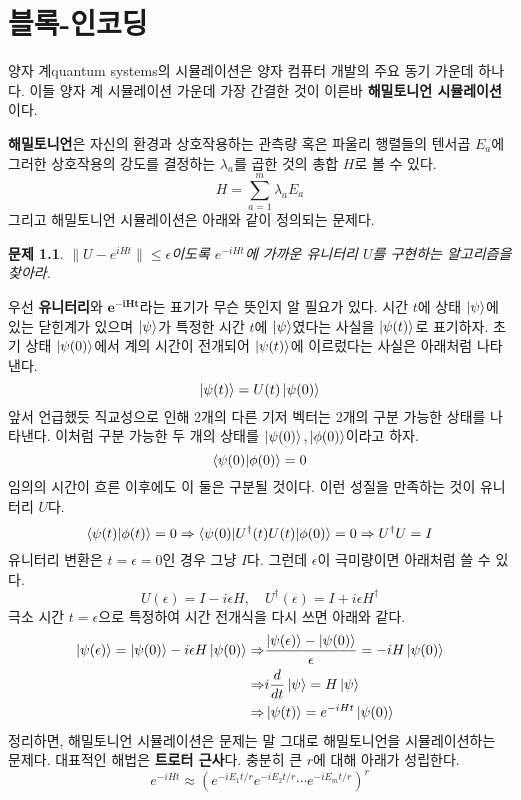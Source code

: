 \documentclass[a4paper,atbegshi,chapter,]{oblivoir}
\newtheorem{prob}{문제}[chapter]
\begin{document}
\chapter{블록-인코딩}
양자 계{\tiny quantum systems}의 시뮬레이션은 양자 컴퓨터 개발의 주요 동기 가운데 하나다.
이들 양자 계 시뮬레이션 가운데 가장 간결한 것이 이른바 \textbf{해밀토니언 시뮬레이션}이다.

\textbf{해밀토니언}은 자신의 환경과 상호작용하는 관측량 혹은 파울리 행렬들의 텐서곱
$E_a$에 그러한 상호작용의 강도를 결정하는 $\lambda_a$를 곱한 것의 총합 $H$로 볼 수 있다.
\[
  H = \sum_{a=1}^m\lambda_a E_a
\]
그리고 해밀토니언 시뮬레이션은 아래와 같이 정의되는 문제다.
\begin{prob}
  $\|U-e^{iHt}\|\leq\epsilon$이도록 $e^{-iHt}$에 가까운 유니터리 $U$를 구현하는
  알고리즘을 찾아라.
\end{prob}
우선 \textbf{유니터리}와 $\pmb{e^{-iHt}}$라는 표기가 무슨 뜻인지 알 필요가 있다.
시간 $t$에 상태 $\ket{\psi}$에 있는 닫힌계가 있으며 $\ket{\psi}$가 특정한 시간 $t$에
$\ket{\psi}$였다는 사실을 $\ket{\psi(t)}$로 표기하자. 초기 상태 $\ket{\psi(0)}$에서
계의 시간이 전개되어 $\ket{\psi(t)}$에 이르렀다는 사실은 아래처럼 나타낸다.
\[
  \ket{\psi(t)}=U(t)\ket{\psi(0)}
\]
앞서 언급했듯 직교성으로 인해 2개의 다른 기저 벡터는 2개의 구분 가능한 상태를 나타낸다.
이처럼 구분 가능한 두 개의 상태를 $\ket{\psi(0)},\ket{\phi(0)}$이라고 하자. 
\[
  \braket{\psi(0)|\phi(0)}=0
\]
임의의 시간이 흐른 이후에도 이 둘은 구분될 것이다. 이런 성질을 만족하는 것이 
유니터리 $U$다. 
\[
  \braket{\psi(t)|\phi(t)}=0 \Rightarrow \braket{\psi(0)|U^{\dagger}(t)U(t)|\phi(0)}=0
                             \Rightarrow U^{\dagger}U=I
\]
유니터리 변환은 $t=\epsilon=0$인 경우 그냥 $I$다. 그런데 $\epsilon$이 극미량이면
아래처럼 쓸 수 있다.
\[
  U(\epsilon)=I-i\epsilon H,\quad U^{\dagger}(\epsilon)=I+i\epsilon H^{\dagger}
\]
극소 시간 $t=\epsilon$으로 특정하여 시간 전개식을 다시 쓰면 아래와 같다.
\begin{align*}
  \ket{\psi(\epsilon)}=\ket{\psi(0)}-i\epsilon H\ket{\psi(0)}
  \Rightarrow &\frac{\ket{\psi(\epsilon)}-\ket{\psi(0)}}{\epsilon}=-iH\ket{\psi(0)} \\
  \Rightarrow & i\frac{d}{dt}\ket{\psi} = H\ket{\psi}\\
  \Rightarrow &\ket{\psi(t)}=e^{-iHt}\ket{\psi(0)}
\end{align*}
정리하면, 해밀토니언 시뮬레이션은 문제는 말 그대로 해밀토니언을 시뮬레이션하는
문제다. 대표적인 해법은 \textbf{트로터 근사}다. 충분히 큰 $r$에 대해 아래가 
성립한다.
\[
  e^{-iHt} \approx \left(e^{-iE_1t/r}e^{-iE_2t/r}\cdots e^{-iE_mt/r}\right)^r
\]
\end{document}
